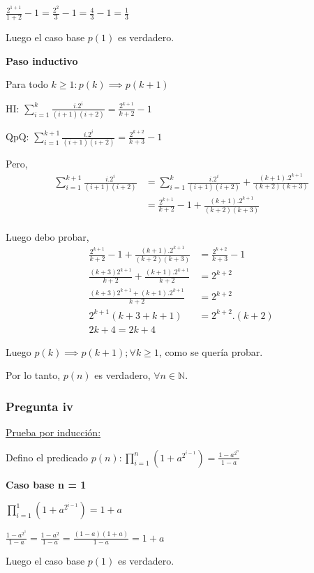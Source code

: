 $\frac{2^{1+1}}{1+2}-1 = \frac{2^2}{3} -1 = \frac{4}{3} - 1 = \frac{1}{3} $

Luego el caso base $p(1)$ es verdadero.

\textbf{Paso inductivo}

Para todo $k \geq 1: p(k) \implies p(k+1)$

HI: $\sum_{i=1}^{k}\frac{i.2^i}{(i+1)(i+2)} = \frac{2^{k+1}}{k+2}-1$

QpQ: $\sum_{i=1}^{k+1}\frac{i.2^i}{(i+1)(i+2)} = \frac{2^{k+2}}{k+3}-1$

Pero,
\begin{align*}
    \sum_{i=1}^{k+1}\frac{i.2^i}{(i+1)(i+2)} &= \sum_{i=1}^{k}\frac{i.2^i}{(i+1)(i+2)} + \frac{(k+1).2^{k+1}}{(k+2)(k+3)} \\
    &= \frac{2^{k+1}}{k+2}-1 + \frac{(k+1).2^{k+1}}{(k+2)(k+3)} \\
\end{align*}

Luego debo probar,
\begin{align*}
    \frac{2^{k+1}}{k+2}-1 + \frac{(k+1).2^{k+1}}{(k+2)(k+3)} &= \frac{2^{k+2}}{k+3}-1 \\
    \frac{(k+3)2^{k+1}}{k+2} + \frac{(k+1).2^{k+1}}{k+2} &= 2^{k+2} \\
    \frac{(k+3)2^{k+1} + (k+1).2^{k+1}}{k+2} &= 2^{k+2} \\
    2^{k+1} \left( k+3 + k+1 \right) &= 2^{k+2} . (k+2) \\
    2k+4 = 2k+4
\end{align*}

Luego $p(k) \implies p(k+1); \forall k \geq 1$, como se quería probar.

Por lo tanto, $p(n)$ es verdadero, $\forall n \in \mathbb{N}$.

\subsubsection{Pregunta iv}

\underline{Prueba por inducción:}

Defino el predicado $p(n) : \prod_{i=1}^{n}\left(1+a^{2^{i-1}}\right)= \frac{1-a^{2^n}}{1-a}$

\textbf{Caso base n = 1}

$\prod_{i=1}^{1}\left(1+a^{2^{i-1}}\right) = 1+a$

$\frac{1-a^{2^1}}{1-a} = \frac{1-a^2}{1-a} = \frac{(1-a)(1+a)}{1-a} = 1+a$

Luego el caso base $p(1)$ es verdadero.

